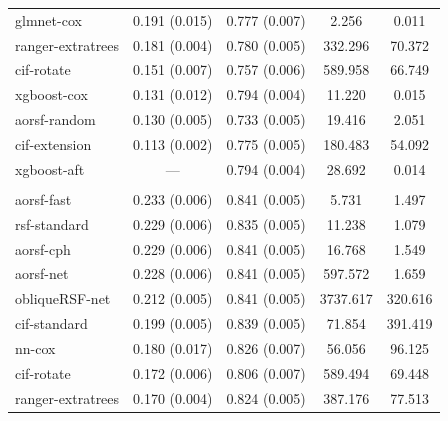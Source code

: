 \documentclass[twoside,11pt]{article}\usepackage[]{graphicx}\usepackage[]{xcolor}
\newenvironment{knitrout}{}{} %
\begin{document}
\begin{knitrout}
\begin{longtable}[t]{lcccc}
\hspace{1em}glmnet-cox & 0.191 (0.015) & 0.777 (0.007) & 2.256 & 0.011\\
\hspace{1em}ranger-extratrees & 0.181 (0.004) & 0.780 (0.005) & 332.296 & 70.372\\
\hspace{1em}cif-rotate & 0.151 (0.007) & 0.757 (0.006) & 589.958 & 66.749\\
\hspace{1em}xgboost-cox & 0.131 (0.012) & 0.794 (0.004) & 11.220 & 0.015\\
\hspace{1em}aorsf-random & 0.130 (0.005) & 0.733 (0.005) & 19.416 & 2.051\\
\hspace{1em}cif-extension & 0.113 (0.002) & 0.775 (0.005) & 180.483 & 54.092\\
\hspace{1em}xgboost-aft & --- & 0.794 (0.004) & 28.692 & 0.014\\
\addlinespace[0.3em]
\multicolumn{5}{l}{\textit{\textbf{ARIC; heart failure, n = 13623, p = 41}}}\\
\hline
\hspace{1em}aorsf-fast & 0.233 (0.006) & 0.841 (0.005) & 5.731 & 1.497\\
\hspace{1em}rsf-standard & 0.229 (0.006) & 0.835 (0.005) & 11.238 & 1.079\\
\hspace{1em}aorsf-cph & 0.229 (0.006) & 0.841 (0.005) & 16.768 & 1.549\\
\hspace{1em}aorsf-net & 0.228 (0.006) & 0.841 (0.005) & 597.572 & 1.659\\
\hspace{1em}obliqueRSF-net & 0.212 (0.005) & 0.841 (0.005) & 3737.617 & 320.616\\
\hspace{1em}cif-standard & 0.199 (0.005) & 0.839 (0.005) & 71.854 & 391.419\\
\hspace{1em}nn-cox & 0.180 (0.017) & 0.826 (0.007) & 56.056 & 96.125\\
\hspace{1em}cif-rotate & 0.172 (0.006) & 0.806 (0.007) & 589.494 & 69.448\\
\hspace{1em}ranger-extratrees & 0.170 (0.004) & 0.824 (0.005) & 387.176 & 77.513\\

\end{longtable}
\end{knitrout}
\end{document}
